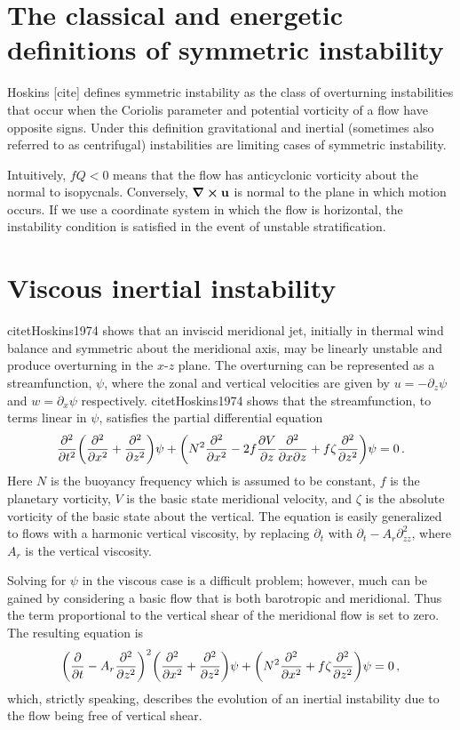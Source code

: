 \section{The classical and energetic definitions of symmetric instability}
Hoskins [cite] defines symmetric instability as the class of overturning instabilities that occur when the Coriolis parameter and potential vorticity of a flow have opposite signs.
Under this definition gravitational and inertial (sometimes also referred to as centrifugal) instabilities are limiting cases of symmetric instability.

Intuitively, $fQ<0$ means that the flow has anticyclonic vorticity about the normal to isopycnals. Conversely, $\curl{\mathbf{u}}$ is normal to the plane in which motion occurs. If we use a coordinate system in which the flow is horizontal, the instability condition is satisfied in the event of unstable stratification.

\section{Viscous inertial instability}
citet{Hoskins1974} shows that an inviscid meridional jet, initially in thermal wind balance and symmetric about the meridional axis, may be linearly unstable and produce overturning in the $x$-$z$ plane. The overturning can be represented as a streamfunction, $\psi$, where the zonal and vertical velocities are given by $u = - \partial_z \psi$ and $w = \partial_x \psi$ respectively. citet{Hoskins1974} shows that the streamfunction, to terms linear in $\psi$, satisfies the partial differential equation
\begin{equation}
    \label{eq:OriginalHoskins}
    \pdv[2]{}{t} \bigg(\pdv[2]{}{x} + \pdv[2]{}{z}\bigg) \psi + \bigg( N^2 \pdv[2]{}{x} - 2 f \pdv{V}{z} \pdv[2]{}{x}{z} + f \zeta \pdv[2]{}{z} \bigg) \psi = 0 \, .
\end{equation}
Here $N$ is the buoyancy frequency which is assumed to be constant, $f$ is the planetary vorticity, $V$ is the basic state meridional velocity, and $\zeta$ is the absolute vorticity of the basic state about the vertical.
The equation is easily generalized to flows with a harmonic vertical viscosity, by replacing $\partial_t$ with $\partial_t - A_r \partial^2_{zz}$, where $A_r$ is the vertical viscosity. 

Solving for $\psi$ in the viscous case is a difficult problem; however, much can be gained by considering a basic flow that is both barotropic and meridional. Thus the term proportional to the vertical shear of the meridional flow is set to zero. The resulting equation is
\begin{equation}
    \label{eq:BarotropicHoskins}
    \bigg(\pdv{}{t} - A_r \pdv[2]{}{z} \bigg)^2 \bigg(\pdv[2]{}{x} + \pdv[2]{}{z}\bigg) \psi + \bigg( N^2 \pdv[2]{}{x} + f \zeta \pdv[2]{}{z} \bigg) \psi = 0 \, ,  
\end{equation}
which, strictly speaking, describes the evolution of an inertial instability due to the flow being free of vertical shear.


